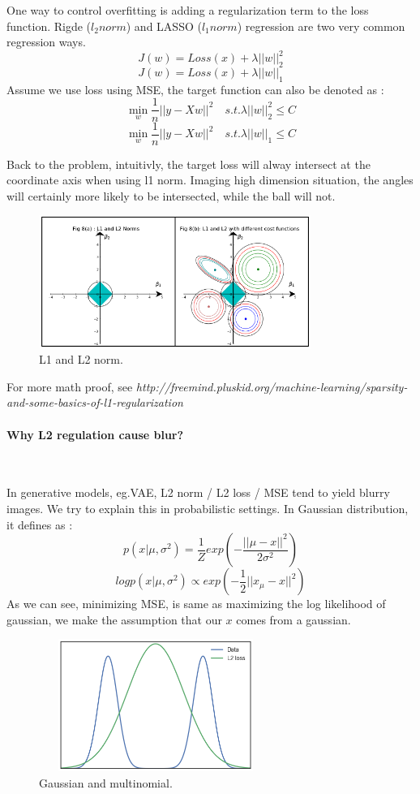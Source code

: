 \documentclass{article}
\begin{document}
One way to control overfitting is adding a regularization term to the loss function. Rigde  ($l_{2} norm$) and LASSO ($l_{1} norm$) regression are two very common regression ways.
$$J(w)=Loss(x)+\lambda ||w||_{2}^{2}$$
$$J(w)=Loss(x)+\lambda ||w||_{1}$$
Assume we use loss using MSE, the target function can also be denoted as :
$$ \mathop{\min}_{w} \frac{1}{n}||y-Xw||^{2} \quad  s.t. \lambda ||w||_{2}^{2} \leq C $$
$$ \mathop{\min}_{w} \frac{1}{n}||y-Xw||^{2} \quad  s.t. \lambda ||w||_{1} \leq C $$

Back to the problem, intuitivly, the target loss will alway intersect at the coordinate axis when using l1 norm. Imaging high dimension situation, the angles will certainly more likely to be intersected, while the ball will not.

\begin{figure}[H]
\centering
\includegraphics[width=3.5in,height=1.7in]{l1l2}
\caption{L1 and L2 norm.}
\end{figure}

For more math proof, see \textit{http://freemind.pluskid.org/machine-learning/sparsity-and-some-basics-of-l1-regularization}

\paragraph{Why L2 regulation cause blur?}~{}

In generative models, eg.VAE, L2 norm / L2 loss / MSE tend to yield blurry images. We try to explain this in probabilistic settings. In Gaussian distribution, it defines as :
$$p(x|\mu,\sigma^{2})=\frac{1}{Z}exp\left( -\frac{||\mu-x||^{2}}{2\sigma^{2}}\right)$$
$$logp(x|\mu,\sigma^{2}) \propto exp\left(-\frac{1}{2}||x_{\mu}-x||^{2}  \right)$$
As we can see, minimizing MSE, is same as maximizing the log likelihood of gaussian, we make the assumption that our $x$ comes from a gaussian.


\begin{figure}[H]
\centering
\includegraphics[width=3in,height=1.7in]{l2}
\caption{Gaussian and multinomial.}
\end{figure}
\end{document}
